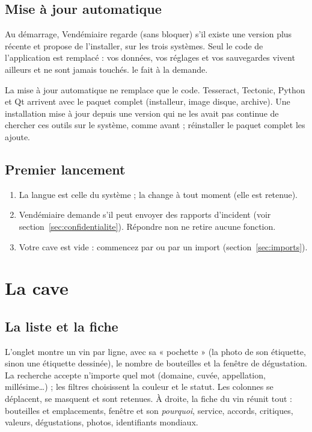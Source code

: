 \documentclass[11pt,a4paper]{article}
\begin{document}
\subsection{Mise à jour automatique}
Au démarrage, Vendémiaire regarde (sans bloquer) s'il existe une version plus récente et propose de
l'installer, sur les trois systèmes. Seul le code de l'application est remplacé : vos données, vos
réglages et vos sauvegardes vivent ailleurs et ne sont jamais touchés.  le fait à la demande.
\begin{attention}
La mise à jour automatique ne remplace que le code. Tesseract, Tectonic, Python et Qt arrivent avec le
paquet complet (installeur, image disque, archive). Une installation mise à jour depuis une version qui ne
les avait pas continue de chercher ces outils sur le système, comme avant ; réinstaller le paquet complet
les ajoute.
\end{attention}

\subsection{Premier lancement}
\begin{enumerate}
  \item La langue est celle du système ;  la change à tout moment (elle est retenue).
  \item Vendémiaire demande s'il peut envoyer des rapports d'incident (voir
        section~\ref{sec:confidentialite}). Répondre non ne retire aucune fonction.
  \item Votre cave est vide : commencez par  ou par un import
        (section~\ref{sec:imports}).
\end{enumerate}

\section{La cave}

\subsection{La liste et la fiche}
L'onglet  montre un vin par ligne, avec sa « pochette » (la photo de son étiquette, sinon une
étiquette dessinée), le nombre de bouteilles et la fenêtre de dégustation. La recherche accepte n'importe
quel mot (domaine, cuvée, appellation, millésime…) ; les filtres choisissent la couleur et le statut. Les
colonnes se déplacent, se masquent et sont retenues. À droite, la fiche du vin réunit tout : bouteilles et
emplacements, fenêtre et son \emph{pourquoi}, service, accords, critiques, valeurs, dégustations, photos,
identifiants mondiaux.
\end{document}
